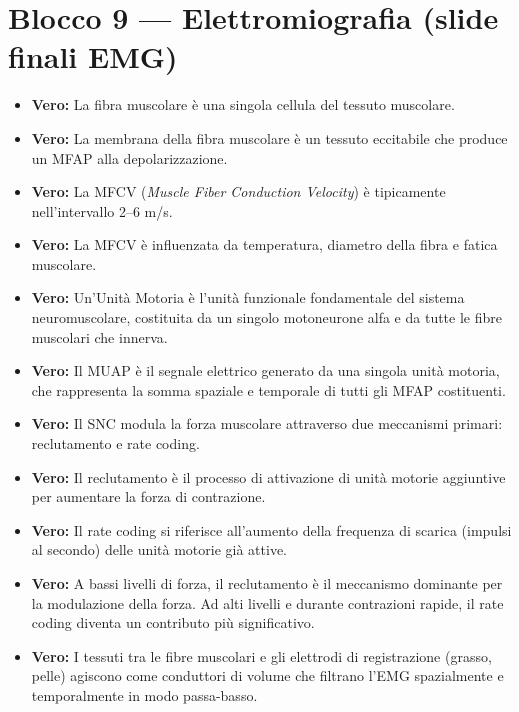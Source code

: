 \section{Blocco 9 — Elettromiografia (slide finali EMG)}

\begin{itemize}
    \item \textbf{Vero:} La fibra muscolare è una singola cellula del tessuto muscolare.
    
    \item \textbf{Vero:} La membrana della fibra muscolare è un tessuto eccitabile che produce un MFAP alla depolarizzazione.
    
    \item \textbf{Vero:} La MFCV (\textit{Muscle Fiber Conduction Velocity}) è tipicamente nell'intervallo 2--6 m/s.
    
    \item \textbf{Vero:} La MFCV è influenzata da temperatura, diametro della fibra e fatica muscolare.
    
    \item \textbf{Vero:} Un'Unità Motoria è l'unità funzionale fondamentale del sistema neuromuscolare, costituita da un singolo motoneurone alfa e da tutte le fibre muscolari che innerva.
    
    \item \textbf{Vero:} Il MUAP è il segnale elettrico generato da una singola unità motoria, che rappresenta la somma spaziale e temporale di tutti gli MFAP costituenti.
    
    \item \textbf{Vero:} Il SNC modula la forza muscolare attraverso due meccanismi primari: reclutamento e rate coding.
    
    \item \textbf{Vero:} Il reclutamento è il processo di attivazione di unità motorie aggiuntive per aumentare la forza di contrazione.
    
    \item \textbf{Vero:} Il rate coding si riferisce all'aumento della frequenza di scarica (impulsi al secondo) delle unità motorie già attive.
    
    \item \textbf{Vero:} A bassi livelli di forza, il reclutamento è il meccanismo dominante per la modulazione della forza. Ad alti livelli e durante contrazioni rapide, il rate coding diventa un contributo più significativo.
    
    \item \textbf{Vero:} I tessuti tra le fibre muscolari e gli elettrodi di registrazione (grasso, pelle) agiscono come conduttori di volume che filtrano l'EMG spazialmente e temporalmente in modo passa-basso.
    

\end{itemize}
